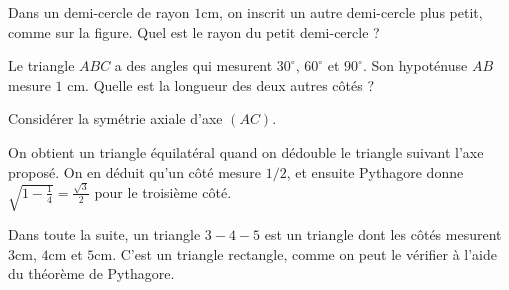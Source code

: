 


\begin{exo}
Dans un demi-cercle de rayon $1$cm, on inscrit un autre demi-cercle plus petit, comme sur la figure.
Quel est le rayon du petit demi-cercle ?
\begin{center}
\end{center}
\end{exo}




\begin{exo}
Le triangle $ABC$ a des angles qui mesurent $30^\circ$, $60^\circ$ et $90^\circ$.
Son hypoténuse $AB$ mesure $1$ cm.
Quelle est la longueur des deux autres côtés ?
\begin{center}
\end{center}
\begin{hint}
Considérer la symétrie axiale d'axe $(AC)$.
\end{hint}
\begin{sol}
On obtient un triangle équilatéral quand on dédouble le triangle suivant l'axe proposé. On en déduit qu'un côté mesure $1/2$, et ensuite Pythagore donne $\sqrt{1-\frac14} = \frac{\sqrt 3}{2}$ pour le troisième côté.
\end{sol}
\end{exo}



Dans toute la suite, un triangle \og $3-4-5$\fg{} est un triangle dont les côtés mesurent $3$cm, $4$cm et $5$cm. C'est un triangle rectangle, comme on peut le vérifier à l'aide du théorème de Pythagore.


